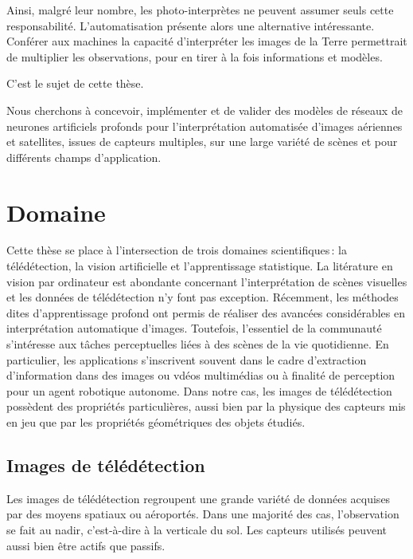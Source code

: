 Ainsi, malgré leur nombre, les photo-interprètes ne peuvent assumer seuls cette responsabilité. L'automatisation présente alors une alternative intéressante. Conférer aux machines la capacité d'interpréter les images de la Terre permettrait de multiplier les observations, pour en tirer à la fois informations et modèles.

C'est le sujet de cette thèse.

Nous cherchons à concevoir, implémenter et de valider des modèles de réseaux de neurones artificiels profonds pour l'interprétation automatisée d'images aériennes et satellites, issues de capteurs multiples, sur une large variété de scènes et pour différents champs d'application.

\begin{figure}
    \centering
    \def\svgwidth{\columnwidth}
    
\end{figure}

\section{Domaine}

Cette thèse se place à l'intersection de trois domaines scientifiques\,: la télédétection, la vision artificielle et l'apprentissage statistique. La litérature en vision par ordinateur est abondante concernant l'interprétation de scènes visuelles et les données de télédétection n'y font pas exception. Récemment, les méthodes dites d'apprentissage profond ont permis de réaliser des avancées considérables en interprétation automatique d'images. Toutefois, l'essentiel de la communauté s'intéresse aux tâches perceptuelles liées à des scènes de la vie quotidienne. En particulier, les applications s'inscrivent souvent dans le cadre d'extraction d'information dans des images ou vdéos multimédias ou à finalité de perception pour un agent robotique autonome. Dans notre cas, les images de télédétection possèdent des propriétés particulières, aussi bien par la physique des capteurs mis en jeu que par les propriétés géométriques des objets étudiés.

\subsection{Images de télédétection}

Les images de télédétection regroupent une grande variété de données acquises par des moyens spatiaux ou aéroportés. Dans une majorité des cas, l'observation se fait au nadir, c'est-à-dire à la verticale du sol. Les capteurs utilisés peuvent aussi bien être actifs que passifs.

